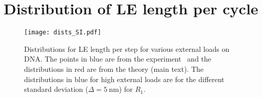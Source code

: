 \documentclass[aps,preprint]{revtex4-1}
\newcommand{\nm}{\ \mathrm{nm}}
\newcommand{\DR}{\Delta R}
\newcommand{\Dl}{\Delta l}
\begin{document}

\section{Distribution of LE length per cycle}
\begin{figure}[]
\centering
\texttt{[image: dists\_SI.pdf]}
\caption{\label{fig:dist_SI} Distributions for LE length per step for various external loads on DNA. The points in blue are from the  experiment~\cite{ryu2020resolving} and the distributions in red are from the theory (main text). The distributions in blue for high external loads are for the different standard deviation ($\Delta=5\nm$) for $R_1$.  
}
\end{figure}
\end{document}
